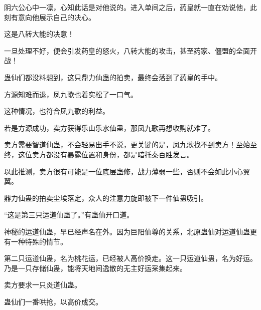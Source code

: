 \begin{this_body}
阴六公心中一凛，心知此话是对他说的。进入单间之后，药皇就一直在劝说他，此刻有意向他展示自己的决心。

这是八转大能的决意！

一旦处理不好，便会引发药皇的怒火，八转大能的攻击，甚至药家、僵盟的全面开战！

蛊仙们都没料想到，这只鼎力仙蛊的拍卖，最终会落到了药皇的手中。

方源知难而退，凤九歌也着实松了一口气。

这种情况，也符合凤九歌的利益。

若是方源成功，卖方获得乐山乐水仙蛊，那凤九歌再想收购就难了。

卖方需要智道仙蛊，不会轻易出手不说，更关键的是，凤九歌找不到卖方！至始至终，这位卖方都没有暴露位置和身份，都是暗托秦百胜发言。

以此推测，卖方很有可能是一位底层蛊修，战力薄弱一些，否则不会如此小心翼翼。

鼎力仙蛊的拍卖尘埃落定，众人的注意力旋即被下一件仙蛊吸引。

“这是第三只运道仙蛊了。”有蛊仙开口道。

神秘的运道仙蛊，早已经声名在外。因为巨阳仙尊的关系，北原蛊仙对运道仙蛊更有一种特殊的情节。

第二只运道仙蛊，名为桃花运，已经被人高价换走。这一只运道仙蛊，名为好运。乃是一只存储仙蛊，能将天地间逸散的无主好运采集起来。

卖方要求一只炎道仙蛊。

蛊仙们一番哄抢，以高价成交。

\end{this_body}

